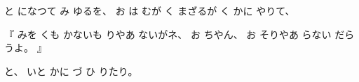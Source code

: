 と
になつて
み
ゆるを、
%
お
は
むが
く
まざるが
く
かに
やりて、

『
みを
くも
かないも
りやあ
ないがネ、
%
お
ちやん、
%
お
そりやあ
らない
だらうよ。
』

と、
%
いと
かに
づ
ひ
りたり。
